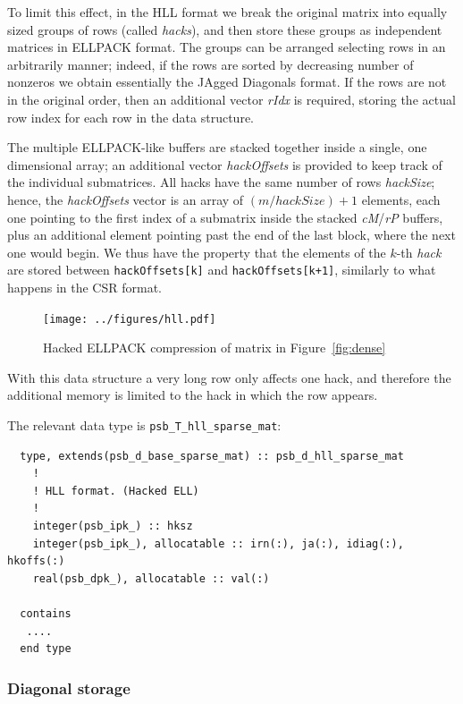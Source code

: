 To limit this effect, in the HLL format  we break the original matrix
into equally sized groups of rows (called \textit{hacks}), and then store
these groups as independent matrices in ELLPACK format. 
The groups can be arranged selecting rows in an arbitrarily manner;
indeed, if the rows are sorted by decreasing number of nonzeros we
obtain essentially the JAgged Diagonals format. 
If the rows are not in the original order, then an   additional vector
\textit{rIdx} is required, storing the actual row index  for each row
in the data structure.

The multiple ELLPACK-like buffers are stacked together inside a
single, one dimensional array; 
an additional  vector \textit{hackOffsets} is provided to keep track
of the individual submatrices.
All hacks have the same number of rows  \textit{hackSize}; hence, 
the \textit{hackOffsets} vector is  an array of
$(m/hackSize)+1$ elements, each one pointing  to the first index of a
submatrix inside the stacked \textit{cM}/\textit{rP} buffers, plus an
additional element pointing past the end of the last block, where the
next one would begin. 
We thus have the property that  
the elements of the $k$-th \textit{hack} are stored between \verb|hackOffsets[k]| and
\verb|hackOffsets[k+1]|, similarly to what happens in the CSR format. 

\begin{figure}[ht]
	\centering
	 \texttt{[image: ../figures/hll.pdf]}
	\caption{Hacked ELLPACK compression of matrix in Figure~\ref{fig:dense}}
	\label{fig:hll}
\end{figure} 

With this data structure a very long row only affects one hack, and
therefore the additional memory is limited to the hack in which the
row appears.

The relevant data type is \verb|psb_T_hll_sparse_mat|:
\begin{verbatim}
  type, extends(psb_d_base_sparse_mat) :: psb_d_hll_sparse_mat
    !
    ! HLL format. (Hacked ELL) 
    !     
    integer(psb_ipk_) :: hksz
    integer(psb_ipk_), allocatable :: irn(:), ja(:), idiag(:), hkoffs(:)
    real(psb_dpk_), allocatable :: val(:)

  contains
   ....
  end type
\end{verbatim}

\subsubsection*{Diagonal storage}


